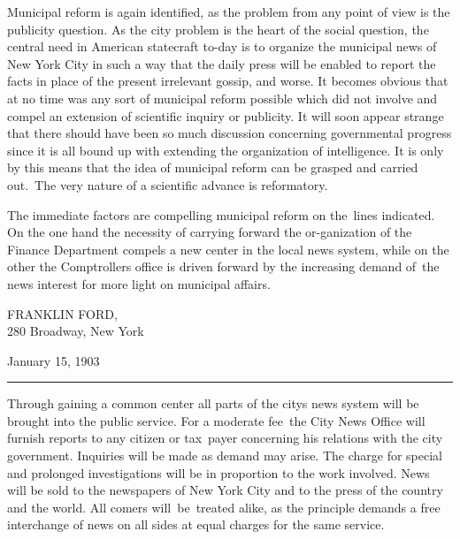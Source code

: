 \documentclass[openany,nobib]{tufte-book}
\begin{document}
Municipal reform is again identified, as the problem from any point of
view is the publicity question. As the city problem is the heart of the
social question, the central need in American statecraft to-day is to
organize the municipal news of New York City in such a way that the
daily press will be enabled to report the facts in place of the present
irrelevant gossip, and worse. It becomes obvious that at no time was any
sort of municipal reform possible which did not involve and compel an
extension of scientific inquiry or publicity. It will soon appear
strange that there should have been so much discussion concerning
governmental progress since it is all bound up with extending the
organization of intelligence. It is only by this means that the idea of
municipal reform can be grasped and carried out.~The very nature of a
scientific advance is reformatory.~~


The immediate factors are compelling municipal reform on the~lines
indicated. On the one hand the necessity of carrying forward the
or-\newpage\noindent ganization of the Finance Department compels a new center in the local
news system, while on the other the Comptroller\textquotesingle s office
is driven forward by the increasing demand of~the news interest for more
light on municipal affairs.~

\vspace{0.15in}

\hfill{\large FRANKLIN FORD},\\
\hfill 280 Broadway, New York

\vspace{0.1in}

January 15, 1903

\begin{center}
\vspace{0.15in}
\noindent\rule{2in}{0.5pt} 
\vspace{0.15in}
\end{center}

\noindent Through gaining a common center all parts of the city\textquotesingle s
news system will be brought into the public service. For a moderate
fee~the City News Office will furnish reports to any citizen or
tax~payer concerning his relations with the city government. Inquiries
will be made as demand may arise. The charge for special and prolonged
investigations will be in proportion to the work involved. News will be
sold to the newspapers of New York City and to the press of the country
and the world. All comers will~be~treated alike, as the principle
demands a free interchange of news on all sides at equal charges for the
same service.~
\end{document}
